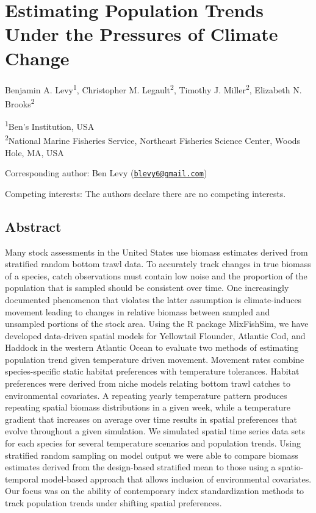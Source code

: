 \documentclass[
  12pt,
]{article}
\author{}
\date{\vspace{-2.5em}}
\begin{document}
\newpage

\hypertarget{estimating-population-trends-under-the-pressures-of-climate-change}{%
\section{Estimating Population Trends Under the Pressures of Climate Change}\label{estimating-population-trends-under-the-pressures-of-climate-change}}

Benjamin A. Levy\textsuperscript{1}, Christopher M. Legault\textsuperscript{2}, Timothy J. Miller\textsuperscript{2}, Elizabeth N. Brooks\textsuperscript{2}

\textsuperscript{1}Ben's Institution, USA\\
\textsuperscript{2}National Marine Fisheries Service, Northeast Fisheries Science Center, Woods Hole, MA, USA

Corresponding author: Ben Levy (\href{mailto:blevy6@gmail.com}{\nolinkurl{blevy6@gmail.com}})

Competing interests: The authors declare there are no competing interests.

\newpage

\hypertarget{abstract}{%
\subsection{Abstract}\label{abstract}}

Many stock assessments in the United States use biomass estimates derived from stratified random bottom trawl data. To accurately track changes in true biomass of a species, catch observations must contain low noise and the proportion of the population that is sampled should be consistent over time. One increasingly documented phenomenon that violates the latter assumption is climate-induces movement leading to changes in relative biomass between sampled and unsampled portions of the stock area. Using the R package MixFishSim, we have developed data-driven spatial models for Yellowtail Flounder, Atlantic Cod, and Haddock in the western Atlantic Ocean to evaluate two methods of estimating population trend given temperature driven movement. Movement rates combine species-specific static habitat preferences with temperature tolerances. Habitat preferences were derived from niche models relating bottom trawl catches to environmental covariates. A repeating yearly temperature pattern produces repeating spatial biomass distributions in a given week, while a temperature gradient that increases on average over time results in spatial preferences that evolve throughout a given simulation. We simulated spatial time series data sets for each species for several temperature scenarios and population trends. Using stratified random sampling on model output we were able to compare biomass estimates derived from the design-based stratified mean to those using a spatio-temporal model-based approach that allows inclusion of environmental covariates. Our focus was on the ability of contemporary index standardization methods to track population trends under shifting spatial preferences.
\end{document}

